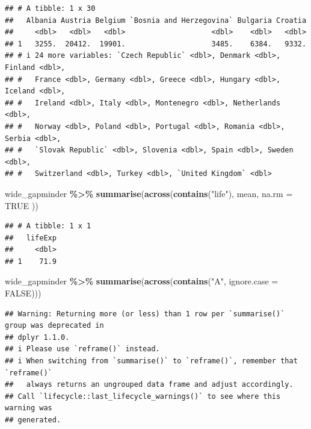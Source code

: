\documentclass[
]{book}
\newenvironment{Shaded}{\begin{snugshade}}{\end{snugshade}}
\newcommand{\AttributeTok}[1]{\textcolor[rgb]{0.13,0.29,0.53}{#1}}
\newcommand{\ConstantTok}[1]{\textcolor[rgb]{0.56,0.35,0.01}{#1}}
\newcommand{\FunctionTok}[1]{\textcolor[rgb]{0.13,0.29,0.53}{\textbf{#1}}}
\newcommand{\NormalTok}[1]{#1}
\newcommand{\SpecialCharTok}[1]{\textcolor[rgb]{0.81,0.36,0.00}{\textbf{#1}}}
\newcommand{\StringTok}[1]{\textcolor[rgb]{0.31,0.60,0.02}{#1}}
\begin{document}
\begin{verbatim}
## # A tibble: 1 x 30
##   Albania Austria Belgium `Bosnia and Herzegovina` Bulgaria Croatia
##     <dbl>   <dbl>   <dbl>                    <dbl>    <dbl>   <dbl>
## 1   3255.  20412.  19901.                    3485.    6384.   9332.
## # i 24 more variables: `Czech Republic` <dbl>, Denmark <dbl>, Finland <dbl>,
## #   France <dbl>, Germany <dbl>, Greece <dbl>, Hungary <dbl>, Iceland <dbl>,
## #   Ireland <dbl>, Italy <dbl>, Montenegro <dbl>, Netherlands <dbl>,
## #   Norway <dbl>, Poland <dbl>, Portugal <dbl>, Romania <dbl>, Serbia <dbl>,
## #   `Slovak Republic` <dbl>, Slovenia <dbl>, Spain <dbl>, Sweden <dbl>,
## #   Switzerland <dbl>, Turkey <dbl>, `United Kingdom` <dbl>
\end{verbatim}

\begin{Shaded}
\begin{Highlighting}[]
\NormalTok{wide\_gapminder }\SpecialCharTok{\%\textgreater{}\%}
  \FunctionTok{summarise}\NormalTok{(}\FunctionTok{across}\NormalTok{(}\FunctionTok{contains}\NormalTok{(}\StringTok{"life"}\NormalTok{),}
\NormalTok{    mean,}
    \AttributeTok{na.rm =} \ConstantTok{TRUE}
\NormalTok{  ))}
\end{Highlighting}
\end{Shaded}

\begin{verbatim}
## # A tibble: 1 x 1
##   lifeExp
##     <dbl>
## 1    71.9
\end{verbatim}

\begin{Shaded}
\begin{Highlighting}[]
\NormalTok{wide\_gapminder }\SpecialCharTok{\%\textgreater{}\%}
  \FunctionTok{summarise}\NormalTok{(}\FunctionTok{across}\NormalTok{(}\FunctionTok{contains}\NormalTok{(}\StringTok{"A"}\NormalTok{, }\AttributeTok{ignore.case =} \ConstantTok{FALSE}\NormalTok{)))}
\end{Highlighting}
\end{Shaded}

\begin{verbatim}
## Warning: Returning more (or less) than 1 row per `summarise()` group was deprecated in
## dplyr 1.1.0.
## i Please use `reframe()` instead.
## i When switching from `summarise()` to `reframe()`, remember that `reframe()`
##   always returns an ungrouped data frame and adjust accordingly.
## Call `lifecycle::last_lifecycle_warnings()` to see where this warning was
## generated.
\end{verbatim}
\end{document}
